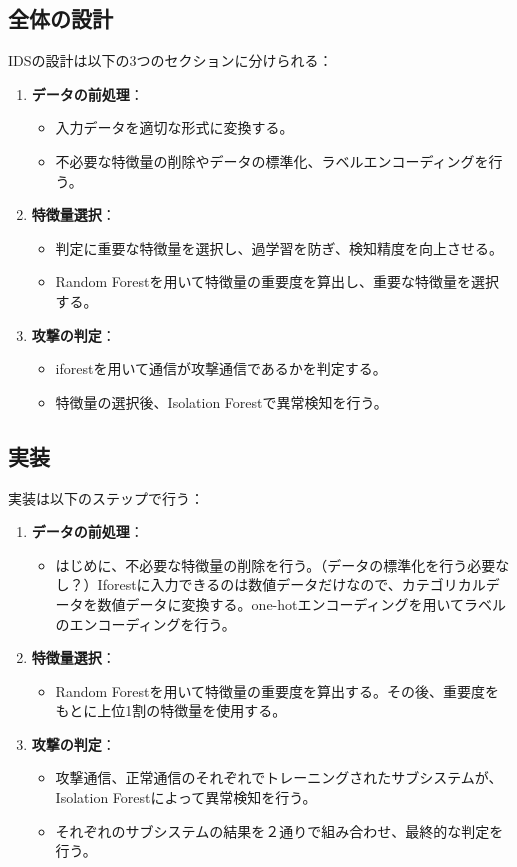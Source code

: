 \documentclass{css}
\begin{document}
\subsection{全体の設計}
IDSの設計は以下の3つのセクションに分けられる：
\begin{enumerate}
    \item \textbf{データの前処理}：
        \begin{itemize}
            \item 入力データを適切な形式に変換する。
            \item 不必要な特徴量の削除やデータの標準化、ラベルエンコーディングを行う。
        \end{itemize}
    \item \textbf{特徴量選択}：
        \begin{itemize}
            \item 判定に重要な特徴量を選択し、過学習を防ぎ、検知精度を向上させる。
            \item Random Forestを用いて特徴量の重要度を算出し、重要な特徴量を選択する。
        \end{itemize}
    \item \textbf{攻撃の判定}：
        \begin{itemize}
            \item iforestを用いて通信が攻撃通信であるかを判定する。
            \item 特徴量の選択後、Isolation Forestで異常検知を行う。
        \end{itemize}
\end{enumerate}

\subsection{実装}
実装は以下のステップで行う：
\begin{enumerate}
    \item \textbf{データの前処理}：
        \begin{itemize}
            \item はじめに、不必要な特徴量の削除を行う。（データの標準化を行う必要なし？）Iforestに入力できるのは数値データだけなので、カテゴリカルデータを数値データに変換する。one-hotエンコーディングを用いてラベルのエンコーディングを行う。
        \end{itemize}
    \item \textbf{特徴量選択}：
        \begin{itemize}
            \item Random Forestを用いて特徴量の重要度を算出する。その後、重要度をもとに上位1割の特徴量を使用する。
        \end{itemize}
    \item \textbf{攻撃の判定}：
        \begin{itemize}
            \item 攻撃通信、正常通信のそれぞれでトレーニングされたサブシステムが、Isolation Forestによって異常検知を行う。
            \item それぞれのサブシステムの結果を２通りで組み合わせ、最終的な判定を行う。
        \end{itemize}
\end{enumerate}
\end{document}
